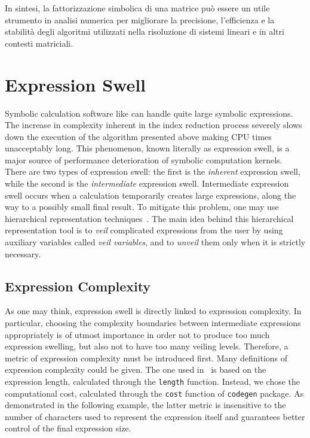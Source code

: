 In sintesi, la fattorizzazione simbolica di una matrice può essere un utile strumento in analisi numerica per migliorare la precisione, l'efficienza e la stabilità degli algoritmi utilizzati nella risoluzione di sistemi lineari e in altri contesti matriciali.





\section{Expression Swell}
\label{chap5:sec:lem}

Symbolic calculation software like \Maple{} can handle quite large symbolic expressions. The increase in complexity inherent in the index reduction process severely slows down the execution of the algorithm presented above making CPU times unacceptably long. This phenomenon, known literally as expression swell, is a major source of performance deterioration of symbolic computation kernels. There are two types of expression swell: the first is the \emph{inherent} expression swell, while the second is the \emph{intermediate} expression swell. Intermediate expression swell occurs when a calculation temporarily creates large expressions, along the way to a possibly small final result. To mitigate this problem, one may use hierarchical representation techniques~\cite{zhou2006hierarchical}. The main idea behind this hierarchical representation tool is to \emph{veil} complicated expressions from the user by using auxiliary variables called \emph{veil variables}, and to \emph{unveil} them only when it is strictly necessary. %

\subsection{Expression Complexity}

As one may think, expression swell is directly linked to expression complexity. In particular, choosing the complexity boundaries between intermediate expressions appropriately is of utmost importance in order not to produce too much expression swelling, but also not to have too many veiling levels. Therefore, a metric of expression complexity must be introduced first. Many definitions of expression complexity could be given. The one used in~\cite{carette2006linear,zhou2006hierarchical} is based on the expression length, calculated through the \texttt{length} \Maple{} function. Instead, we chose the computational cost, calculated through the \texttt{cost} function of \texttt{codegen} package. As demonstrated in the following example, the latter metric is insensitive to the number of characters used to represent the expression itself and guarantees better control of the final expression size.

